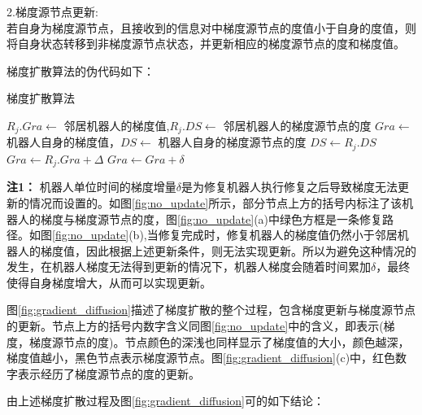 2.梯度源节点更新:\\
\indent 若自身为梯度源节点，且接收到的信息对中梯度源节点的度值小于自身的度值，则将自身状态转移到非梯度源节点状态，并更新相应的梯度源节点的度和梯度值。

梯度扩散算法的伪代码如下：\\
\begin{algorithm}
	\caption{梯度扩散算法}
	\label{algorithm:gradient_diffusion}
	\begin{algorithmic}[1]
		\Require $R_j.Gra \leftarrow$ 邻居机器人的梯度值,$R_j.DS \leftarrow$  邻居机器人的梯度源节点的度
		\Ensure $Gra \leftarrow$ 机器人自身的梯度值，$DS \leftarrow$  机器人自身的梯度源节点的度
				\State $DS \gets R_j.DS$
				\State $Gra \gets R_j.Gra + \Delta$
			\Else
				\State $Gra \gets Gra + \delta$
			\EndIf		
			\State {}
		\EndFunction
	\end{algorithmic}
\end{algorithm}

\textbf{注1：} \indent 机器人单位时间的梯度增量$\delta$是为修复机器人执行修复之后导致梯度无法更新的情况而设置的。如图\ref{fig:no_update}所示，部分节点上方的括号内标注了该机器人的梯度与梯度源节点的度，图\ref{fig:no_update}(a)中绿色方框是一条修复路径。如图\ref{fig:no_update}(b),当修复完成时，修复机器人的梯度值仍然小于邻居机器人的梯度值，因此根据上述更新条件，则无法实现更新。所以为避免这种情况的发生，在机器人梯度无法得到更新的情况下，机器人梯度会随着时间累加$\delta$，最终使得自身梯度增大，从而可以实现更新。
\begin{figure*}[!htbp]
	\centering
	\hspace{1cm}
\end{figure*}

图\ref{fig:gradient_diffusion}描述了梯度扩散的整个过程，包含梯度更新与梯度源节点的更新。节点上方的括号内数字含义同图\ref{fig:no_update}中的含义，即表示(梯度，梯度源节点的度)。节点颜色的深浅也同样显示了梯度值的大小，颜色越深，梯度值越小，黑色节点表示梯度源节点。图\ref{fig:gradient_diffusion}(c)中，红色数字表示经历了梯度源节点的度的更新。
\begin{figure*}[!htbp]
	\centering
	\hspace{0.5cm}
	\hspace{0.5cm}
\end{figure*}
由上述梯度扩散过程及图\ref{fig:gradient_diffusion}可的如下结论：\\

